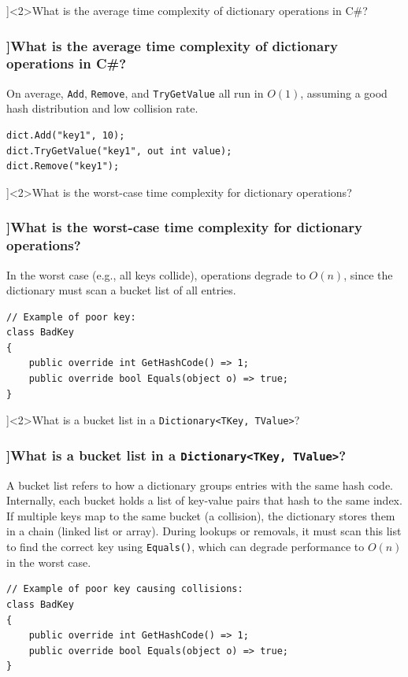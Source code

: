 \QuestionSlide[\CategoryBadge[CollColor!20]{Collections}]<2>{What is the average time complexity of dictionary operations in C\#?}
\begin{frame}[fragile]
  \frametitle{\AnswerTitle[\CategoryBadge[CollColor!20]{Collections}]{What is the average time complexity of dictionary operations in C\#?}}

  {\footnotesize
    On average, \texttt{Add}, \texttt{Remove}, and \texttt{TryGetValue} all run in \(O(1)\), assuming a good hash distribution and low collision rate.
  }

  \begin{verbatim}
dict.Add("key1", 10);
dict.TryGetValue("key1", out int value);
dict.Remove("key1");
  \end{verbatim}
\end{frame}

\QuestionSlide[\CategoryBadge[CollColor!20]{Collections}]<2>{What is the worst-case time complexity for dictionary operations?}
\begin{frame}[fragile]
  \frametitle{\AnswerTitle[\CategoryBadge[CollColor!20]{Collections}]{What is the worst-case time complexity for dictionary operations?}}

  {\footnotesize
    In the worst case (e.g., all keys collide), operations degrade to \(O(n)\), since the dictionary must scan a bucket list of all entries.
  }

  \begin{verbatim}
// Example of poor key:
class BadKey 
{
    public override int GetHashCode() => 1; 
    public override bool Equals(object o) => true; 
}
  \end{verbatim}
\end{frame}

\QuestionSlide[\CategoryBadge[CollColor!20]{Collections}]<2>{What is a bucket list in a \texttt{Dictionary<TKey, TValue>}?}
\begin{frame}[fragile]
  \frametitle{\AnswerTitle[\CategoryBadge[CollColor!20]{Collections}]{What is a bucket list in a \texttt{Dictionary<TKey, TValue>}?}}

  {\footnotesize
    A bucket list refers to how a dictionary groups entries with the same hash code. Internally, each bucket holds a list of key-value pairs that hash to the same index. 
    If multiple keys map to the same bucket (a collision), the dictionary stores them in a chain (linked list or array). 
    During lookups or removals, it must scan this list to find the correct key using \texttt{Equals()}, which can degrade performance to \(O(n)\) in the worst case.
  }

  \begin{verbatim}
// Example of poor key causing collisions:
class BadKey 
{
    public override int GetHashCode() => 1; 
    public override bool Equals(object o) => true; 
}
  \end{verbatim}
\end{frame}

